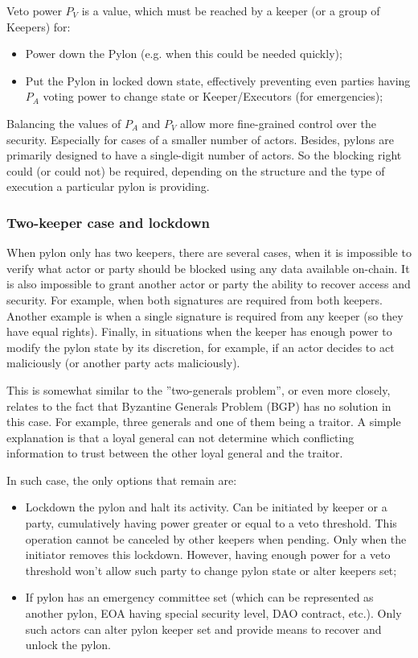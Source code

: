 \documentclass[12pt]{article}
\begin{document}
\medskip
Veto power $P_V$ is a value, which must be reached by a keeper (or a group of Keepers) for:
\begin{itemize}
\item{Power down the Pylon (e.g. when this could be needed quickly);}
\item{Put the Pylon in locked down state, effectively preventing even parties having $P_A$ voting power to change state or Keeper/Executors (for emergencies);}
\end{itemize}

Balancing the values of $P_A$ and $P_V$ allow more fine-grained control over the security. Especially for cases of a smaller number of actors. Besides, pylons are primarily designed to have a single-digit number of actors. So the blocking right could (or could not) be required, depending on the structure and the type of execution a particular pylon is providing.

\subsubsection{Two-keeper case and lockdown}


When pylon only has two keepers, there are several cases, when it is impossible to verify what actor or party should be blocked using any data available on-chain. It is also impossible to grant another actor or party the ability to recover access and security. For example, when both signatures are required from both keepers. Another example is when a single signature is required from any keeper (so they have equal rights). Finally, in situations when the keeper has enough power to modify the pylon state by its discretion, for example, if an actor decides to act maliciously (or another party acts maliciously).

This is somewhat similar to the ”two-generals problem”, or even more closely, relates to the fact that Byzantine Generals Problem (BGP) has no solution in this case. For example, three generals and one of them being a traitor. A simple explanation is that a loyal general can not determine which conflicting information to trust between the other loyal general and the traitor.

\smallskip
In such case, the only options that remain are:
\begin{itemize}
\item{Lockdown the pylon and halt its activity. Can be initiated by keeper or a party, cumulatively having power greater or equal to a veto threshold. This operation cannot be canceled by other keepers when pending. Only when the initiator removes this lockdown. However, having enough power for a veto threshold won’t allow such party to change pylon state or alter keepers set;}
\item{If pylon has an emergency committee set (which can be represented as another pylon, EOA having special security level, DAO contract, etc.). Only such actors can alter pylon keeper set and provide means to recover and unlock the pylon.}
\end{itemize}
\end{document}
